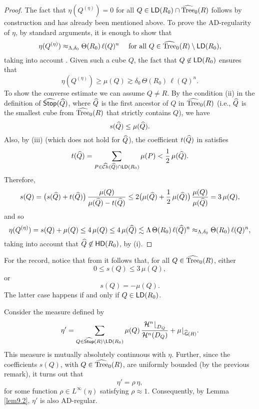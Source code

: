 \begin{proof}
The fact that $\eta(Q^{(\eta)})=0$ for all $Q\in{\mathsf{LD}}(R_0)\cap{\widehat{{\rm Tree}}}_0(R)$ follows by construction and has already been mentioned above.
To prove the AD-regularity of $\eta$, by standard arguments, it is enough to show that
$$\eta(Q^{(\eta)})\approx_{\Lambda,\delta_0} \Theta(R_0)\,\ell(Q)^n\quad\mbox{ for all $Q\in{\widehat{{\rm Tree}}}_0(R)\setminus
{\mathsf{LD}}(R_0)$,}$$
taking into account .
Given such a cube $Q$, the fact that $Q\not\in{\mathsf{LD}}(R_0)$ ensures that
$$\eta(Q^{(\eta)})\geq \mu(Q)\gtrsim\delta_0\,\Theta(R_0)\,\ell(Q)^n.
$$
To show the converse estimate we can assume $Q\neq R$. By
the condition (ii) in the definition of ${\widehat{{\mathsf {Stop}}}}({\widehat{Q}})$, where ${\widehat{Q}}$ is the first ancestor of $Q$ in ${\widehat{{\rm Tree}}}_0(R)$
(i.e., ${\widehat{Q}}$ is the smallest cube from ${\widehat{{\rm Tree}}}_0(R)$ that strictly contains $Q$), we have
$$s({\widehat{Q}})\leq \mu({\widehat{Q}}).$$
Also, by (iii) (which does not hold for ${\widehat{Q}}$), the coefficient $t({\widehat{Q}})$ in  satisfies
$$t({\widehat{Q}}) = \sum_{P\in{\widehat{{\mathcal Ch}}}({\widehat{Q}})\cap {\mathsf{LD}}(R_0)}\mu(P) < \frac12\,\mu({\widehat{Q}}).$$
Therefore,
\begin{equation}\label{eqaq745}
s(Q) = \big(s({\widehat{Q}}) + t({\widehat{Q}})\big)\, 
\frac{\mu(Q)}{\mu({\widehat{Q}})-t({\widehat{Q}})} \leq 2 \big(\mu({\widehat{Q}}) + \frac12\,\mu({\widehat{Q}})\big)\, 
\frac{\mu(Q)}{\mu({\widehat{Q}})} = 3\,\mu(Q),
\end{equation}
and so
$$\eta(Q^{(\eta)}) = s(Q) + \mu(Q)\leq 4\,\mu(Q)\leq 4\,\mu({\widehat{Q}})\lesssim \Lambda\, \Theta(R_0)\,\ell({\widehat{Q}})^n
\approx_{\Lambda,\delta_0} \Theta(R_0)\,\ell(Q)^n,
$$
taking into account that ${\widehat{Q}}\not \in{\mathsf{HD}}(R_0)$, by (i).
\end{proof}
\vv

\begin{rem}
For the record, notice that from  it follows that, for all $Q\in{\widehat{{\rm Tree}}}_0(R)$, either
\begin{equation}\label{eq:aQmuQ}
0\leq s(Q)\leq 3\,\mu(Q),
\end{equation}
or 
$$s(Q)=-\mu(Q).$$
The latter case happens if and only if $Q\in{\mathsf{LD}}(R_0)$.
\end{rem}
\vv

\begin{rem}
Consider the measure defined by
$$\eta' = \sum_{Q\in{\widehat{{\mathsf {Stop}}}}(R)\setminus{\mathsf{LD}}(R_0)} \mu(Q)\,\frac{{\mathcal H}^n{\lfloor}_{D_Q}}{{\mathcal H}^n(D_Q)} + \mu{\lfloor}_{{\widehat{{\mathsf{G}}}}(R)}.$$
This measure is mutually absolutely continuous with $\eta$. Further, since the
coefficients $s(Q)$, with $Q\in{\widehat{{\rm Tree}}}_0(R)$, are uniformly bounded (by the previous remark), it turns out that
$$\eta'= \rho\,\eta,$$
for some function $\rho\in L^\infty(\eta)$ satisfying $\rho\approx1$.
Consequently, by Lemma \ref{lem9.2}, $\eta'$ is also AD-regular.
\end{rem}



